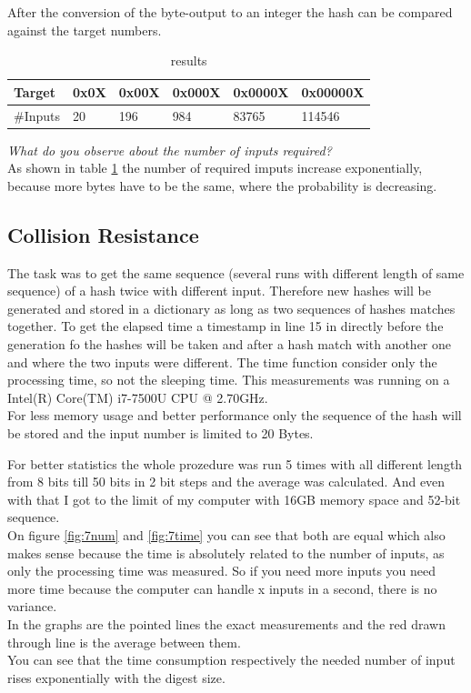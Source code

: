 After the conversion of the byte-output to an integer the hash can be compared against the target numbers.\\

\begin{table}[h]
\begin{tabular}{|l|l|l|l|l|l|}
Target   & 0x0X & 0x00X & 0x000X & 0x0000X & 0x00000X \\
\hline
\#Inputs & 20   & 196   & 984    & 83765   & 114546  
\end{tabular}
\caption{results} \label{tab:7res}
\end{table}

\textit{What do you observe about the number of inputs required?}\\
As shown in table \ref{tab:7res} the number of required imputs increase exponentially, because more bytes have to be the same, where the probability is decreasing.\\


\subsection{Collision Resistance}


The task was to get the same sequence (several runs with different length of same sequence) of a hash twice with different input. Therefore new hashes will be generated and stored in a dictionary as long as two sequences of hashes matches together. To get the elapsed time a timestamp in line 15 in  directly before the generation fo the hashes will be taken and after a hash match with another one and where the two inputs were different. The time function consider only the processing time, so not the sleeping time. This measurements was running on a Intel(R) Core(TM) i7-7500U CPU @ 2.70GHz.\\

For less memory usage and better performance only the sequence of the hash will be stored and the input number is limited to 20 Bytes.

For better statistics the whole prozedure was run 5 times with all different length from 8 bits till 50 bits in 2 bit steps and the average was calculated. And even with that I got to the limit of my computer with 16GB memory space and 52-bit sequence.\\

On figure \ref{fig:7num} and \ref{fig:7time} you can see that both are equal which also makes sense because the time is absolutely related to the number of inputs, as only the processing time was measured. So if you need more inputs you need more time because the computer can handle x inputs in a second, there is no variance. \\
In the graphs are the pointed lines the exact measurements and the red drawn through line is the average between them.\\
You can see that the time consumption respectively the needed number of input rises exponentially with the digest size.

